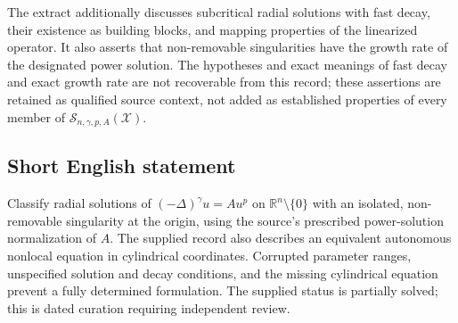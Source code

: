 \documentclass[11pt]{article}
\newcommand{\R}{\mathbb{R}}
\begin{document}
The extract additionally discusses subcritical radial solutions with fast decay, their existence as building blocks, and mapping properties of the linearized operator. It also asserts that non-removable singularities have the growth rate of the designated power solution. The hypotheses and exact meanings of fast decay and exact growth rate are not recoverable from this record; these assertions are retained as qualified source context, not added as established properties of every member of \(\mathcal S_{n,\gamma,p,A}(\mathcal X)\).
\subsection{Short English statement}
Classify radial solutions of \(( -\Delta)^\gamma u=A u^p\) on \(\R^n\setminus\{0\}\) with an isolated, non-removable singularity at the origin, using the source's prescribed power-solution normalization of \(A\). The supplied record also describes an equivalent autonomous nonlocal equation in cylindrical coordinates. Corrupted parameter ranges, unspecified solution and decay conditions, and the missing cylindrical equation prevent a fully determined formulation. The supplied status is partially solved; this is dated curation requiring independent review.
\end{document}
